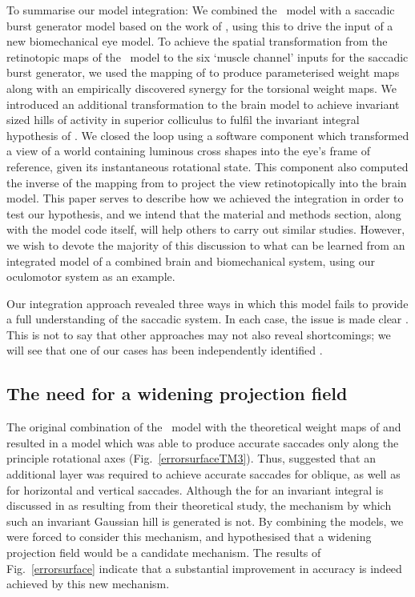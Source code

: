 \documentclass{frontiersSCNS}
\begin{document}
To summarise our model integration: We combined
the \ccg~model \citep{cope_basal_2017} with a saccadic burst generator
model based on the work of \cite{gancarz_neural_1998}, using this to
drive the input of a new biomechanical eye model. To achieve the
spatial transformation from the retinotopic maps of the \ccg~model to
the six `muscle channel' inputs for the saccadic burst generator, we
used the mapping of \cite{ottes_visuomotor_1986} to produce
parameterised weight maps along with an empirically discovered synergy
for the torsional weight maps. We introduced an additional
transformation to the brain model to achieve invariant sized hills of
activity in superior colliculus to fulfil the invariant integral
hypothesis of \cite{tabareau_geometry_2007}. We closed the loop using
a software component which transformed a view of a world containing
luminous cross shapes into the eye's frame of reference, given its
instantaneous rotational state. This component also computed the
inverse of the mapping from \cite{ottes_visuomotor_1986} to project
the view retinotopically into the brain model.
%
This paper serves to describe how we achieved the integration in order
to test our hypothesis, and we intend that the material and methods
section, along with the model code itself, will help others to carry
out similar studies. However, we wish to devote the majority of this
discussion to what can be learned from an integrated model of a
combined brain and biomechanical system, using our oculomotor system
as an example.

Our integration approach revealed three ways in which this model fails
to provide a full understanding of the saccadic system. In each case,
the issue is made clear . This is
not to say that other approaches may not also reveal shortcomings; we
will see that one of our cases has been independently identified
\citep{groh_effects_2011}.

\subsection{The need for a widening projection field}

The original combination of the \ccg~model with the theoretical weight
maps of \cite{ottes_visuomotor_1986} and \cite{tabareau_geometry_2007}
resulted in a model which was able to produce accurate saccades only
along the principle rotational axes
(Fig.~\ref{errorsurfaceTM3}). Thus, 
suggested that an additional layer was required to achieve accurate
saccades for oblique, as well as for horizontal and vertical
saccades. Although the  for an invariant integral is discussed
in \cite{tabareau_geometry_2007} as resulting from their theoretical
study, the mechanism by which such an invariant Gaussian hill is
generated is not. By combining the models, we were forced to consider
this mechanism, and hypothesised that a widening projection field
would be a candidate mechanism. The results of Fig.~\ref{errorsurface}
indicate that a substantial improvement in accuracy is indeed achieved
by this new mechanism.
\end{document}

